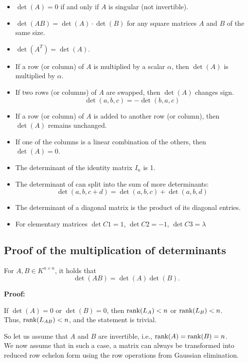 \begin{itemize}
    \item \(\det(A) = 0\) if and only if \(A\) is singular (not invertible).
    \item \(\det(AB) = \det(A) \cdot \det(B)\) for any square matrices \(A\) and \(B\) of the same size.
    \item \(\det(A^T) = \det(A)\).
    \item If a row (or column) of \(A\) is multiplied by a scalar \(\alpha\), 
    then \(\det(A)\) is multiplied by \(\alpha\).
    \item If two rows (or columns) of \(A\) are swapped, then \(\det(A)\) changes sign.
    \[\det(a,b,c) = - \det(b,a,c)\]
    \item If a row (or column) of \(A\) is added to another row (or column), then \(\det(A)\) remains unchanged.
    \item If one of the columns is a linear combination of the others, then \(\det(A) = 0\).
    \item The determinant of the identity matrix \(I_n\) is 1.
    \item The determinant of can split into the sum of more determinants:
    \[
    \det(a,b,c + d) = \det(a,b,c) + \det(a,b,d)
    \]
    \item The determinant of a diagonal matrix is the product of its diagonal entries.
    \item For elementary matrices \(\det C1 = 1\), \(\det C2 = -1\), \(\det C3 = \lambda\)
\end{itemize}

\subsection{Proof of the multiplication of determinants}

For \( A, B \in K^{n \times n} \), it holds that
\[
\det(AB) = \det(A)\det(B).
\]

\textbf{Proof:}

If \( \det(A) = 0 \) or \( \det(B) = 0 \), 
then \( \text{rank}(L_A) < n \) or \( \text{rank}(L_B) < n \). \\
Thus, \( \text{rank}(L_{AB}) < n \), 
and the statement is trivial.

So let us assume that \(A\) and \(B\) are 
invertible, i.e., \( \text{rank}(A) = \text{rank}(B) = n \). \\
We now assume that in such a case, a matrix can 
always be transformed into reduced row 
echelon form using the row operations 
from Gaussian elimination.

